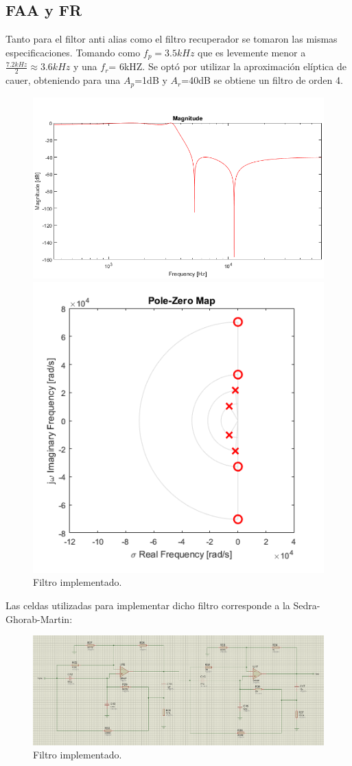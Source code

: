 \subsection{FAA y FR}
Tanto para el filtor anti alias como el filtro recuperador se tomaron las mismas especificaciones.
Tomando como $f_p= 3.5kHz$ que es levemente menor a $\frac{7.2kHz}{2}\approx 3.6kHz $ y una $f_r$= 6kHZ.
Se optó por utilizar la aproximación elíptica de cauer, obteniendo para una $A_p$=1dB y $A_r$=40dB se obtiene un filtro de orden 4.
\begin{figure}[H]
\centering
\includegraphics[width=0.7\linewidth, page=1]{ImagenesEjercicio1/magnitude.png}

\includegraphics[width=0.5\linewidth, page=1]{ImagenesEjercicio1/pz.png}
\caption{Filtro implementado.}
\label{filtros}
\end{figure}

Las celdas utilizadas para implementar dicho filtro corresponde a la Sedra-Ghorab-Martin:
\begin{figure}[H]
\centering
\includegraphics[width=0.8\linewidth, page=1]{ImagenesEjercicio1/celdasSedras.png}
\caption{Filtro implementado.}
\label{filtros}
\end{figure}

